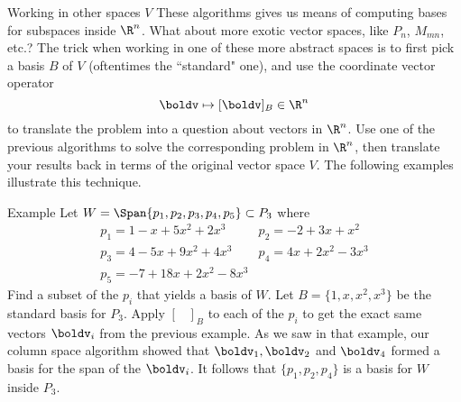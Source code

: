 \begin{frame}{Working in other spaces $V$}
These algorithms gives us means of computing bases for subspaces inside $\R^n$. What about more exotic vector spaces, like $P_n$, $M_{mn}$, etc.? 
\bspace 
The trick when working in one of these more abstract spaces is to first pick a basis $B$ of $V$ (oftentimes the ``standard" one), and use the coordinate vector operator 
\[
\boldv\mapsto [\boldv]_B\in\R^n
\]
to translate the problem into a question about vectors in $\R^n$. 
\bpause Use one of the previous algorithms to solve the corresponding problem in $\R^n$, then translate your results back in terms of the original vector space $V$. 
\bspace The following examples illustrate this technique. 
\end{frame}
\begin{frame}{Example}
Let $W=\Span\{p_1,p_2, p_3, p_4, p_5\}\subset P_3$ where 
\[
\begin{array}{ll}
p_1=1-x+5x^2+2x^3&p_2=-2+3x+x^2\\
p_3=4-5x+9x^2+4x^3&p_4=4x+2x^2-3x^3\\
p_5=-7+18x+2x^2-8x^3
\end{array}
\]
Find a subset of the $p_i$ that yields a basis of $W$. 
\bpause 
Let $B=\{1,x,x^2, x^3\}$ be the standard basis for $P_3$. Apply $[\hspace{10pt}]_B$ to each of the $p_i$ to get the exact same vectors $\boldv_i$ from the previous example.
\bpause As we saw in that example, our column space algorithm showed that $\boldv_1, \boldv_2$ and $\boldv_4$ formed a basis for the span of the $\boldv_i$. 
\bpause 
It follows that $\{p_1, p_2, p_4\}$ is a basis for $W$ inside $P_3$.
 
\end{frame}
